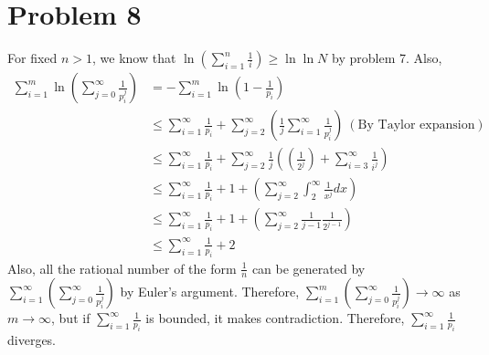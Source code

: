 \documentclass{article}
\begin{document}
\section*{Problem 8}
For fixed $n>1$, we know that $\ln \left(\sum\limits_{i=1}^n \frac{1}{i}\right)\geq \ln \ln N$ by problem 7. Also,
\begin{equation*}
\begin{split}
\sum\limits_{i=1}^m \ln \left(\sum\limits_{j=0}^\infty \frac{1}{p_i^j}\right)&=-\sum\limits_{i=1}^m \ln \left(1-\frac{1}{p_i}\right) \\
&\leq \sum\limits_{i=1}^\infty \frac{1}{p_i} + \sum\limits_{j=2}^\infty \left(\frac{1}{j}\sum\limits_{i=1}^\infty \frac{1}{p^j_i}\right)~(\textrm{By Taylor expansion}) \\
&\leq \sum\limits_{i=1}^\infty \frac{1}{p_i} + \sum\limits_{j=2}^\infty \frac{1}{j}\left(\left(\frac{1}{2^j}\right)+\sum\limits_{i=3}^\infty \frac{1}{i^j}\right) \\
&\leq \sum\limits_{i=1}^\infty \frac{1}{p_i} + 1+\left(\sum\limits_{j=2}^\infty \int_2^\infty \frac{1}{x^j} dx \right) \\
&\leq \sum\limits_{i=1}^\infty \frac{1}{p_i} + 1+\left(\sum\limits_{j=2}^\infty \frac{1}{j-1}\frac{1}{2^{j-1}}\right) \\
&\leq \sum\limits_{i=1}^\infty \frac{1}{p_i} + 2
\end{split}
\end{equation*}
Also, all the rational number of the form $\frac{1}{n}$ can be generated by $\sum\limits_{i=1}^\infty\left(\sum\limits_{j=0}^\infty \frac{1}{p_i^j}\right)$ by Euler's argument. Therefore, $\sum\limits_{i=1}^m\left(\sum\limits_{j=0}^\infty \frac{1}{p_i^j}\right)\rightarrow \infty$ as $m\rightarrow \infty$, but if $\sum\limits_{i=1}^\infty \frac{1}{p_i}$ is bounded, it makes contradiction. Therefore, $\sum\limits_{i=1}^\infty \frac{1}{p_i}$ diverges.
\end{document}
